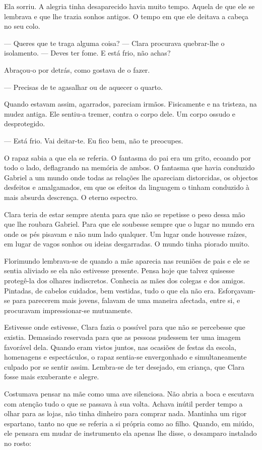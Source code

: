 Ela sorriu. A alegria tinha desaparecido havia muito tempo. Aquela de
que ele se lembrava e que lhe trazia sonhos antigos. O tempo em que ele
deitava a cabeça no seu colo.

--- Queres que te traga alguma coisa? --- Clara procurava quebrar-lhe o
isolamento. --- Deves ter fome. E está frio, não achas?

Abraçou-o por detrás, como gostava de o fazer.

---  Precisas de te agasalhar ou de aquecer o quarto.

Quando estavam assim, agarrados, pareciam irmãos. Fisicamente e na
tristeza, na mudez antiga. Ele sentiu-a tremer, contra o corpo dele. Um
corpo ossudo e desprotegido.

--- Está frio. Vai deitar-te. Eu fico bem, não te preocupes.

O rapaz sabia a que ela se referia. O fantasma do pai era um grito,
ecoando por todo o lado, deflagrando na memória de ambos. O fantasma que
havia conduzido Gabriel a um mundo onde todas as relações lhe apareciam
distorcidas, os objectos desfeitos e amalgamados, em que os efeitos da
linguagem o tinham conduzido à mais absurda descrença. O eterno
espectro.

Clara teria de estar sempre atenta para que não se repetisse o peso
dessa mão que lhe roubara Gabriel. Para que ele soubesse sempre que o
lugar no mundo era onde os pés pisavam e não num lado qualquer. Um lugar
onde houvesse raízes, em lugar de vagos sonhos ou ideias desgarradas. O
mundo tinha piorado muito.

Florimundo lembrava-se de quando a mãe aparecia nas reuniões de pais e
ele se sentia aliviado se ela não estivesse presente. Pensa hoje que
talvez quisesse protegê-la dos olhares indiscretos. Conhecia as mães dos
colegas e dos amigos. Pintadas, de cabelos cuidados, bem vestidas, tudo
o que ela não era. Esforçavam-se para parecerem mais jovens, falavam de
uma maneira afectada, entre si, e procuravam impressionar-se mutuamente.

Estivesse onde estivesse, Clara fazia o possível para que não se
percebesse que existia. Demasiado reservada para que as pessoas pudessem
ter uma imagem favorável dela. Quando eram vistos juntos, nas ocasiões
de festas da escola, homenagens e espectáculos, o rapaz sentia-se
envergonhado e simultaneamente culpado por se sentir assim. Lembra-se de
ter desejado, em criança, que Clara fosse mais exuberante e alegre.

Costumava pensar na mãe como uma ave silenciosa. Não abria a boca e
escutava com atenção tudo o que se passava à sua volta. Achava inútil
perder tempo a olhar para as lojas, não tinha dinheiro para comprar
nada. Mantinha um rigor espartano, tanto no que se referia a si própria
como ao filho. Quando, em miúdo, ele pensara em mudar de instrumento ela
apenas lhe disse, o desamparo instalado no rosto:

